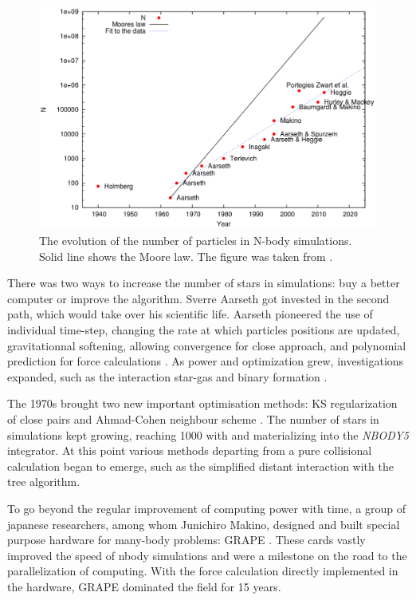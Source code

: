 \begin{figure}
\label{Fig:N_increase}
\includegraphics[width=0.9\linewidth]{Figures/0_N_increase.png}
\caption{The evolution of the number of particles in N-body simulations. Solid line shows the Moore law. The figure was taken from \protect\cite{Bedorf2012}. }
\end{figure}


There was two ways to increase the number of stars in simulations: buy a better computer or improve the algorithm. Sverre Aarseth got invested in the second path, which would take over his scientific life. Aarseth pioneered the use of individual time-step, changing the rate at which particles positions are updated, gravitationnal softening, allowing convergence for close approach, and polynomial prediction for force calculations \citep{Aarseth1964}. As power and optimization grew, investigations expanded, such as the interaction star-gas \citep{VanAlbada1968a} and binary formation \citep{VanAlbada1968b}.

The 1970s brought two new important optimisation methods: KS regularization of close pairs \citep{Aarseth1972} and Ahmad-Cohen neighbour scheme \citep{AhmadCohen1973}. The number of stars in simulations kept growing, reaching 1000 with \cite{Terlevich1980} and materializing into the \textit{NBODY5} integrator. At this point various methods departing from a pure collisional calculation began to emerge, such as the simplified distant interaction with the \cite{BarnesHut1986} tree algorithm.

To go beyond the regular improvement of computing power with time, a group of japanese researchers, among whom Junichiro Makino, designed and built special purpose hardware for many-body problems: GRAPE \citep{Ebisuzaki1990,Ito1991}. These cards vastly improved the speed of nbody simulations and were a milestone on the road to the parallelization of computing. With the force calculation directly implemented in the hardware, GRAPE dominated the field for 15 years.

